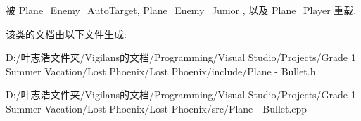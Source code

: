 被 \hyperlink{class_plane___enemy___auto_target_a79e6eda540d282205ce6151ae0b304ca}{Plane\+\_\+\+Enemy\+\_\+\+Auto\+Target}, \hyperlink{class_plane___enemy___junior_a686e46c9927793dd07235cac72d52405}{Plane\+\_\+\+Enemy\+\_\+\+Junior} , 以及 \hyperlink{class_plane___player_ae68c08ce11fad9fd164c00eb4db6b348}{Plane\+\_\+\+Player} 重载.



该类的文档由以下文件生成\+:\begin{DoxyCompactItemize}
\item 
D\+:/叶志浩文件夹/\+Vigilans的文档/\+Programming/\+Visual Studio/\+Projects/\+Grade 1 Summer Vacation/\+Lost Phoenix/\+Lost Phoenix/include/Plane -\/ Bullet.\+h\item 
D\+:/叶志浩文件夹/\+Vigilans的文档/\+Programming/\+Visual Studio/\+Projects/\+Grade 1 Summer Vacation/\+Lost Phoenix/\+Lost Phoenix/src/Plane -\/ Bullet.\+cpp\end{DoxyCompactItemize}
